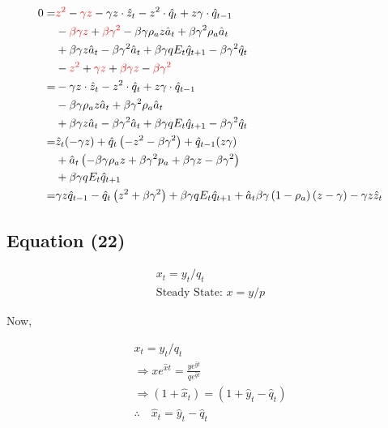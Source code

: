 \documentclass[11pt,preprint, authoryear]{elsarticle}
\numberwithin{equation}{section}
\numberwithin{figure}{section}
\numberwithin{table}{section}
\begin{document}
\[\begin{aligned}
0 = & \begingroup\color{red}z^{2} \endgroup - \begingroup \color{red} {\gamma z} \endgroup - \gamma z \cdot \hat{z}_t - z^{2} \cdot \hat{q}_t 
+ z \gamma \cdot \hat{q}_{t-1}\\
& - \begingroup \color{red}{\beta \gamma z} \endgroup + \begingroup \color{red}{\beta \gamma^{2}} \endgroup - \beta \gamma \rho_{a} z \hat{a}_{t} + \beta \gamma^{2} \rho_{a} \hat{a}_{t}\\
& + \beta \gamma z \hat{a}_{t} - \beta \gamma^{2} \hat{a}_{t}
+\beta \gamma q E_{t} \hat{q}_{t+1}-\beta \gamma^{2} \hat{q}_{t} \\
& - \begingroup \color{red}{z^2} \endgroup + \begingroup \color{red}{\gamma z} \endgroup + \begingroup \color{red}{\beta \gamma z} \endgroup - \begingroup \color{red}{\beta \gamma^2} \endgroup \\
=& - \gamma z \cdot \hat{z}_t 
- z^{2} \cdot \hat{q}_t 
+ z \gamma \cdot \hat{q}_{t-1}\\
&-\beta \gamma \rho_{a} z \hat{a}_{t}+\beta \gamma^{2} \rho_{a} \hat{a}_{t}\\
&+\beta \gamma z \hat{a}_{t}-\beta \gamma^{2} \hat{a}_{t}
+\beta \gamma q E_{t} \hat{q}_{t+1}-\beta \gamma^{2} \hat{q}_{t} \\
= & \hat{z}_{t}(-\gamma z)+\hat{q}_{t}\left(-z^{2}-\beta \gamma^{2}\right)+\hat{q}_{t-1}(z \gamma) \\
&+\hat{a}_{t}\left(-\beta \gamma \rho_{a} z+\beta \gamma^{2} p_{a}+\beta \gamma z-\beta \gamma^{2}\right) \\
&+\beta \gamma q E_{t} \hat{q}_{t+1}\\
= & \gamma z \hat{q}_{t-1}-\hat{q}_{t}\left(z^{2}+\beta \gamma^{2}\right)+\beta \gamma q E_{t} \hat{q}_{t+1}+\hat{a}_{t} \beta \gamma\left(1-\rho_{a}\right)(z-\gamma)-\gamma z \hat{z}_{t}
\end{aligned}\]

\hypertarget{equation-22}{%
\subsection{Equation (22)}\label{equation-22}}

\[\begin{aligned} x_{t}=y_{t} / q_{t} \\
\text{Steady State: } x = y/p \end{aligned}\]

Now,

\[\begin{aligned} x_{t}=y_{t} / q_t\\
\Rightarrow x e^{\hat{x} t}=\frac{y e^{\hat{y} t}}{q e^{\hat{q} t}}\\
\Rightarrow\left(1+\hat{x}_{t}\right)=\left(1+\hat{y}_{t}-\hat{q}_{t}\right)\\
\therefore \quad \hat{x}_{t}=\hat{y}_{t}-\hat{q}_{t} \end{aligned}\]
\end{document}
